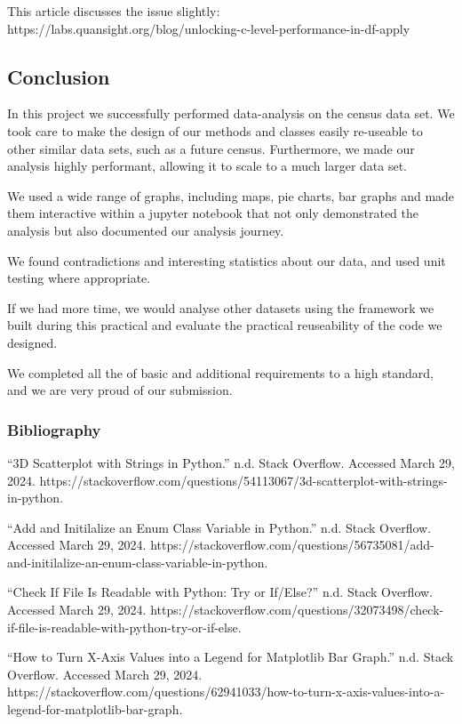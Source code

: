 \documentclass[11pt]{article}
\begin{document}
This article discusses the issue slightly:
https://labs.quansight.org/blog/unlocking-c-level-performance-in-df-apply

    \subsection{\texorpdfstring{\textbf{Conclusion}}{Conclusion}}\label{conclusion}

In this project we successfully performed data-analysis on the census
data set. We took care to make the design of our methods and classes
easily re-useable to other similar data sets, such as a future census.
Furthermore, we made our analysis highly performant, allowing it to
scale to a much larger data set.

We used a wide range of graphs, including maps, pie charts, bar graphs
and made them interactive within a jupyter notebook that not only
demonstrated the analysis but also documented our analysis journey.

We found contradictions and interesting statistics about our data, and
used unit testing where appropriate.

If we had more time, we would analyse other datasets using the framework
we built during this practical and evaluate the practical reuseability
of the code we designed.

We completed all the of basic and additional requirements to a high
standard, and we are very proud of our submission.

    \subsubsection{\texorpdfstring{\textbf{Bibliography}}{Bibliography}}\label{bibliography}

``3D Scatterplot with Strings in Python.'' n.d. Stack Overflow. Accessed
March 29, 2024.
https://stackoverflow.com/questions/54113067/3d-scatterplot-with-strings-in-python.

``Add and Initilalize an Enum Class Variable in Python.'' n.d. Stack
Overflow. Accessed March 29, 2024.
https://stackoverflow.com/questions/56735081/add-and-initilalize-an-enum-class-variable-in-python.

``Check If File Is Readable with Python: Try or If/Else?'' n.d. Stack
Overflow. Accessed March 29, 2024.
https://stackoverflow.com/questions/32073498/check-if-file-is-readable-with-python-try-or-if-else.

``How to Turn X-Axis Values into a Legend for Matplotlib Bar Graph.''
n.d. Stack Overflow. Accessed March 29, 2024.
https://stackoverflow.com/questions/62941033/how-to-turn-x-axis-values-into-a-legend-for-matplotlib-bar-graph.
\end{document}
